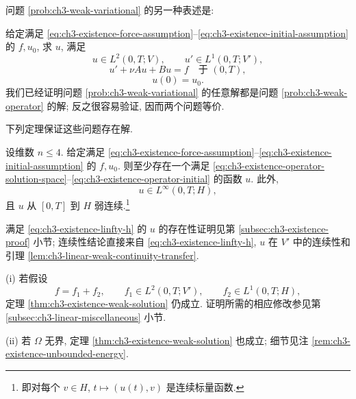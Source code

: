 问题 \ref{prob:ch3-weak-variational} 的另一种表述是:

\MBProblemHeading
\label{prob:ch3-weak-operator}
给定满足 \eqref{eq:ch3-existence-force-assumption}--\eqref{eq:ch3-existence-initial-assumption} 的 $f,u_0$, 求 $u$, 满足
\begin{equation}
u\in L^2(0,T;V),
\qquad u'\in L^1(0,T;V'),
\label{eq:ch3-existence-operator-solution-space}
\end{equation}
\begin{equation}
u'+\nu Au+Bu=f\quad\text{于 }(0,T),
\label{eq:ch3-existence-operator-equation}
\end{equation}
\begin{equation}
u(0)=u_0.
\label{eq:ch3-existence-operator-initial}
\end{equation}
我们已经证明问题 \ref{prob:ch3-weak-variational} 的任意解都是问题 \ref{prob:ch3-weak-operator} 的解; 反之很容易验证, 因而两个问题等价.

下列定理保证这些问题存在解.

\begin{Theorem}
\label{thm:ch3-existence-weak-solution}
设维数 $n\leq4$. 给定满足 \eqref{eq:ch3-existence-force-assumption}--\eqref{eq:ch3-existence-initial-assumption} 的 $f,u_0$. 则至少存在一个满足 \eqref{eq:ch3-existence-operator-solution-space}--\eqref{eq:ch3-existence-operator-initial} 的函数 $u$. 此外,
\begin{equation}
u\in L^\infty(0,T;H),
\label{eq:ch3-existence-linfty-h}
\end{equation}
且 $u$ 从 $[0,T]$ 到 $H$ 弱连续.\footnote{即对每个 $v\in H$, $t\mapsto(u(t),v)$ 是连续标量函数.}
\end{Theorem}

满足 \eqref{eq:ch3-existence-linfty-h} 的 $u$ 的存在性证明见第 \ref{subsec:ch3-existence-proof} 小节; 连续性结论直接来自 \eqref{eq:ch3-existence-linfty-h}, $u$ 在 $V'$ 中的连续性和引理 \ref{lem:ch3-linear-weak-continuity-transfer}.

\hypertarget{chapter-03-page-207}{}
\begin{Remark}
\label{rem:ch3-existence-general-force}
(i) 若假设
\[
f=f_1+f_2,
\qquad f_1\in L^2(0,T;V'),
\qquad f_2\in L^1(0,T;H),
\]
定理 \ref{thm:ch3-existence-weak-solution} 仍成立. 证明所需的相应修改参见第 \ref{subsec:ch3-linear-miscellaneous} 小节.

(ii) 若 $\Omega$ 无界, 定理 \ref{thm:ch3-existence-weak-solution} 也成立; 细节见注 \ref{rem:ch3-existence-unbounded-energy}.
\end{Remark}

